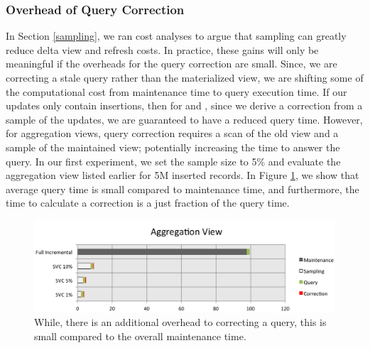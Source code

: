 \subsubsection{Overhead of Query Correction}
In Section \ref{sampling}, we ran cost analyses to argue that sampling can greatly reduce delta view and refresh costs.
In practice, these gains will only be meaningful if the overheads for the query correction are small.
Since, we are correcting a stale query rather than the materialized view, we are shifting some of the computational cost from maintenance time to query execution time.
If our updates only contain insertions, then for \spview and \fjview, since we derive a correction from a sample of the updates, we are guaranteed to have a reduced query time.
However, for aggregation views, query correction requires a scan of the old view and a sample of the maintained view; potentially increasing the time to 
answer the query. 
In our first experiment, we set the sample size to 5\% and evaluate the aggregation view listed earlier for 5M inserted records. 
In Figure \ref{exp10overheads}, we show that average query time is small compared to maintenance time, and furthermore, 
the time to calculate a correction is a just fraction of the query time.
\begin{figure}[h]
\centering
 \includegraphics[width=\columnwidth]{exp/total_time_agg_view.png}
 \caption{While, there is an additional overhead to correcting a query, this is small compared to the overall maintenance time. \label{exp10overheads}}
\end{figure}

